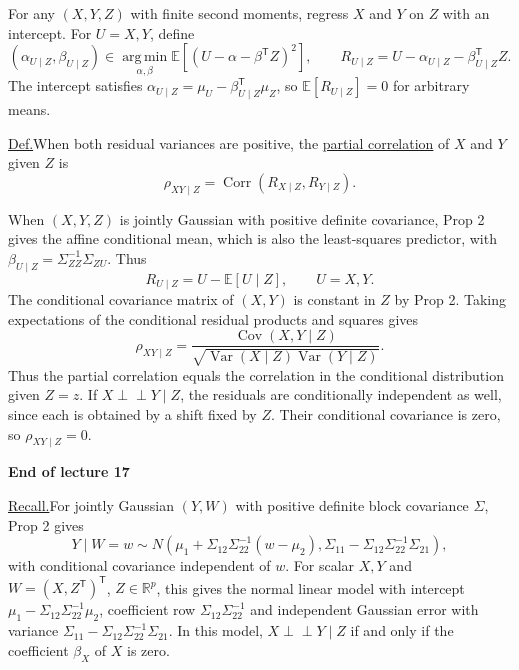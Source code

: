 \documentclass[11pt,a4paper]{article}
\begin{document}
For any $(X,Y,Z)$ with finite second moments, regress $X$ and $Y$ on $Z$
with an intercept. For $U=X,Y$, define
\[
(\alpha_{U\mid Z},\beta_{U\mid Z})
\in\operatorname*{arg\,min}_{\alpha,\beta}
   \mathbb E[(U-\alpha-\beta^{\mathsf T}Z)^2],
\qquad
R_{U\mid Z}=U-\alpha_{U\mid Z}-\beta_{U\mid Z}^{\mathsf T}Z.
\]
The intercept satisfies $\alpha_{U\mid Z}=\mu_U-\beta_{U\mid Z}^{\mathsf T}\mu_Z$,
so $\mathbb E[R_{U\mid Z}]=0$ for arbitrary means.

\medskip
\noindent\underline{Def.}\quad When both residual variances are positive,
the \underline{partial correlation} of $X$ and $Y$ given $Z$ is
\[
\rho_{XY\mid Z}=\operatorname{Corr}(R_{X\mid Z},R_{Y\mid Z}).
\]

\begin{samepage}
When $(X,Y,Z)$ is jointly Gaussian with positive definite covariance,
Prop 2 gives the affine conditional mean, which is also the least-squares
predictor, with $\beta_{U\mid Z}=\Sigma_{ZZ}^{-1}\Sigma_{ZU}$. Thus
\[
R_{U\mid Z}=U-\mathbb E[U\mid Z],\qquad U=X,Y.
\]
The conditional covariance matrix of $(X,Y)$ is constant in $Z$ by Prop 2.
Taking expectations of the conditional residual products and squares gives
\[
\rho_{XY\mid Z}
=\frac{\operatorname{Cov}(X,Y\mid Z)}
 {\sqrt{\operatorname{Var}(X\mid Z)\operatorname{Var}(Y\mid Z)}}.
\]
Thus the partial correlation equals the correlation in the conditional
distribution given $Z=z$. If $X\perp\!\!\!\perp Y\mid Z$, the residuals are
conditionally independent as well, since each is obtained by a shift
fixed by $Z$. Their conditional covariance is zero, so $\rho_{XY\mid Z}=0$.

\begin{center}
\textbf{End of lecture 17}
\end{center}
\end{samepage}

\medskip
\noindent\underline{Recall.}\quad For jointly Gaussian $(Y,W)$ with
positive definite block covariance $\Sigma$, Prop 2 gives
\[
Y\mid W=w\sim N\!\left(
\mu_1+\Sigma_{12}\Sigma_{22}^{-1}(w-\mu_2),
\Sigma_{11}-\Sigma_{12}\Sigma_{22}^{-1}\Sigma_{21}
\right),
\]
with conditional covariance independent of $w$. For scalar $X,Y$ and
$W=(X,Z^{\mathsf T})^{\mathsf T}$, $Z\in\mathbb R^p$, this gives the
normal linear model with intercept $\mu_1-\Sigma_{12}\Sigma_{22}^{-1}\mu_2$,
coefficient row $\Sigma_{12}\Sigma_{22}^{-1}$ and independent Gaussian
error with variance $\Sigma_{11}-\Sigma_{12}\Sigma_{22}^{-1}\Sigma_{21}$.
In this model, $X\perp\!\!\!\perp Y\mid Z$ if and only if the coefficient
$\beta_X$ of $X$ is zero.
\end{document}
